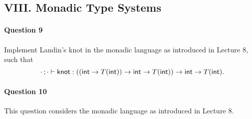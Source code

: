\documentclass[11pt,a4paper,twoside]{article}
\begin{document}
\subsection*{VIII. Monadic Type Systems}

\paragraph{Question 9} Implement Landin's knot in the monadic language as introduced in Lecture 8,
such that  
  \[
    \cdot\, ; \cdot \vdash \mathsf{knot} : 
    ((\mathsf{int} \to T(\mathsf{int})) \to \mathsf{int} \to T(\mathsf{int})) \to \mathsf{int} \to T(\mathsf{int}).
  \]


\paragraph{Question 10} This question considers the monadic language as introduced in Lecture 8.
\end{document}
